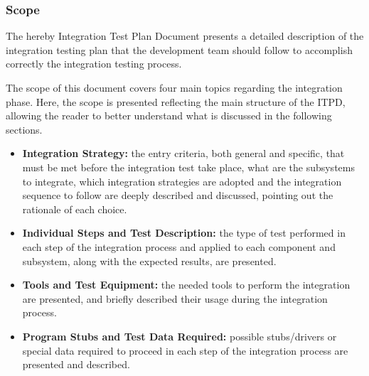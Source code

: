 \subsubsection{Scope}

The hereby Integration Test Plan Document presents a detailed description of the integration testing plan that the development team should follow to accomplish correctly the integration testing process.

The scope of this document covers four main topics regarding the integration phase. Here, the scope is presented reflecting the main structure of the ITPD, allowing the reader to better understand what is discussed in the following sections.

\begin{itemize}
	\item \textbf{Integration Strategy:} the entry criteria, both general and specific, that must be met before the integration test take place, what are the subsystems to integrate, which integration strategies are adopted and the integration sequence to follow are deeply described and discussed, pointing out the rationale of each choice.
	\item \textbf{Individual Steps and Test Description:} the type of test performed in each step of the integration process and applied to each component and subsystem, along with the expected results, are presented.
	\item \textbf{Tools and Test Equipment:} the needed tools to perform the integration are presented, and briefly described their usage during the integration process.
	\item \textbf{Program Stubs and Test Data Required:} possible stubs/drivers or special data required to proceed in each step of the integration process are presented and described. 
\end{itemize}
